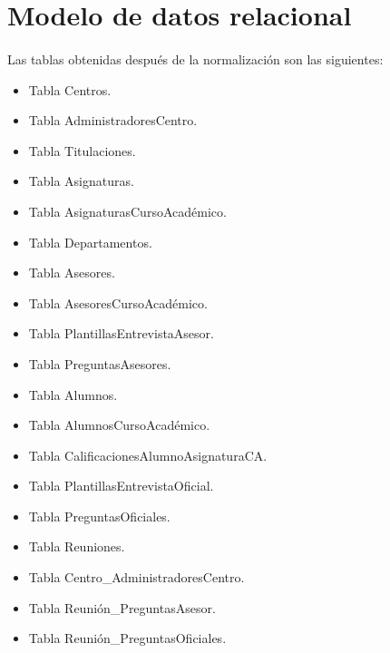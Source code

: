 \section{Modelo de datos relacional}

  \paragraph{}Las tablas obtenidas después de la normalización son las
  siguientes:

  \begin{itemize}
   \item Tabla Centros.
   \item Tabla AdministradoresCentro.
   \item Tabla Titulaciones.
   \item Tabla Asignaturas.
   \item Tabla AsignaturasCursoAcadémico.
   \item Tabla Departamentos.
   \item Tabla Asesores.
   \item Tabla AsesoresCursoAcadémico.
   \item Tabla PlantillasEntrevistaAsesor.
   \item Tabla PreguntasAsesores.
   \item Tabla Alumnos.
   \item Tabla AlumnosCursoAcadémico.
   \item Tabla CalificacionesAlumnoAsignaturaCA.
   \item Tabla PlantillasEntrevistaOficial.
   \item Tabla PreguntasOficiales.
   \item Tabla Reuniones.
   \item Tabla Centro\_AdministradoresCentro.
   \item Tabla Reunión\_PreguntasAsesor.
   \item Tabla Reunión\_PreguntasOficiales.
  \end{itemize}

